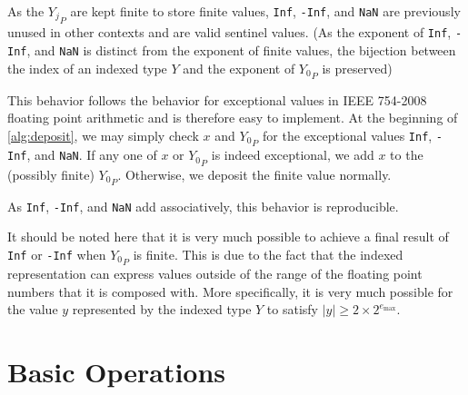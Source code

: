 \documentclass[12pt]{article}
\providecommand{\max}{\ensuremath{\text{max}}}
\theoremstyle{plain}
\begin{document}
      As the ${Y_j}_P$ are kept finite to store finite values, \verb|Inf|, \verb|-Inf|, and \verb|NaN| are previously unused in other contexts and are valid sentinel values. (As the exponent of \verb|Inf|, \verb|-Inf|, and \verb|NaN| is distinct from the exponent of finite values, the bijection between the index of an indexed type $Y$ and the exponent of ${Y_0}_P$ is preserved)

      This behavior follows the behavior for exceptional values in IEEE 754-2008 floating point arithmetic and is therefore easy to implement. At the beginning of \ref{alg:deposit}, we may simply check $x$ and ${Y_0}_P$ for the exceptional values \verb|Inf|, \verb|-Inf|, and \verb|NaN|. If any one of $x$ or ${Y_0}_P$ is indeed exceptional, we add $x$ to the (possibly finite) ${Y_0}_P$. Otherwise, we deposit the finite value normally.

      As \verb|Inf|, \verb|-Inf|, and \verb|NaN| add associatively, this behavior is reproducible.

      It should be noted here that it is very much possible to achieve a final result of \verb|Inf| or \verb|-Inf| when ${Y_0}_P$ is finite. This is due to the fact that the indexed representation can express values outside of the range of the floating point numbers that it is composed with. More specifically, it is very much possible for the value $y$ represented by the indexed type $Y$ to satisfy $|y| \geq 2 \times 2^{e_{\max}}$.

\section{Basic Operations}
\end{document}
